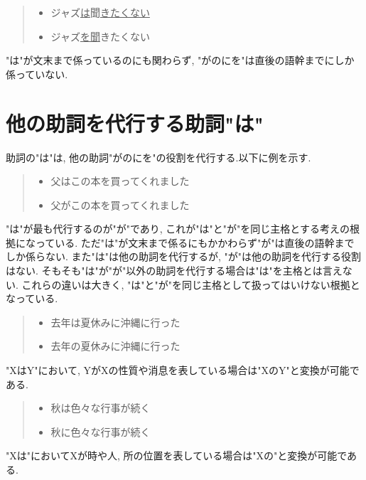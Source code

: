 \documentclass{jreport}
\begin{document}
\begin{quote}
 \begin{itemize}
  \item ジャズ\underline{は}聞\underline{きたくない}
  \item ジャズ\underline{を}\underline{聞}きたくない
 \end{itemize}
\end{quote}

"は"が文末まで係っているのにも関わらず, "がのにを"は直後の語幹までにしか係っていない.


\section{他の助詞を代行する助詞"は"}
助詞の"は"は, 他の助詞"がのにを"の役割を代行する.以下に例を示す.
\begin{quote}
 \begin{itemize}
  \item 父はこの本を買ってくれました
  \item 父がこの本を買ってくれました
 \end{itemize}
\end{quote}
   
"は"が最も代行するのが"が"であり, これが"は"と"が"を同じ主格とする考えの根拠になっている.
ただ"は"が文末まで係るにもかかわらず"が"は直後の語幹までしか係らない.
また"は"は他の助詞を代行するが, "が"は他の助詞を代行する役割はない.
そもそも"は"が"が"以外の助詞を代行する場合は"は"を主格とは言えない.
これらの違いは大きく, "は"と"が"を同じ主格として扱ってはいけない根拠となっている.

\begin{quote}
 \begin{itemize}
  \item 去年は夏休みに沖縄に行った
  \item 去年の夏休みに沖縄に行った
 \end{itemize}
\end{quote}

"XはY"において, YがXの性質や消息を表している場合は"XのY"と変換が可能である.

\begin{quote}
 \begin{itemize}
  \item 秋は色々な行事が続く
  \item 秋に色々な行事が続く
 \end{itemize}
\end{quote}
   
"Xは"においてXが時や人, 所の位置を表している場合は"Xの"と変換が可能である.
\end{document}
